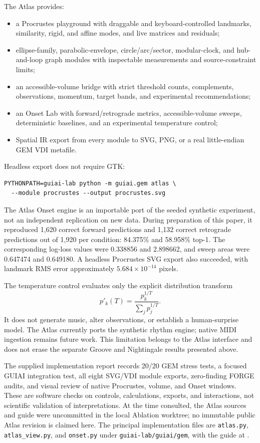 \documentclass[11pt,a4paper]{article}
\begin{document}
The Atlas provides:
\begin{itemize}[nosep]
  \item a Procrustes playground with draggable and keyboard-controlled landmarks, similarity, rigid, and affine modes, and live matrices and residuals;
  \item ellipse-family, parabolic-envelope, circle/arc/sector, modular-clock, and hub-and-loop graph modules with inspectable measurements and source-constraint limits;
  \item an accessible-volume bridge with strict threshold counts, complements, observations, momentum, target bands, and experimental recommendations;
  \item an Onset Lab with forward/retrograde metrics, accessible-volume sweeps, deterministic baselines, and an experimental temperature control;
  \item Spatial IR export from every module to SVG, PNG, or a real little-endian GEM VDI metafile.
\end{itemize}
Headless export does not require GTK:
\begin{lstlisting}
PYTHONPATH=guiai-lab python -m guiai.gem atlas \
  --module procrustes --output procrustes.svg
\end{lstlisting}

The Atlas Onset engine is an importable port of the seeded synthetic experiment, not an independent replication on new data. During preparation of this paper, it reproduced 1,620 correct forward predictions and 1,132 correct retrograde predictions out of 1,920 per condition: 84.375\% and 58.958\% top-1. The corresponding log-loss values were 0.338856 and 2.898662, and sweep areas were 0.647474 and 0.649180. A headless Procrustes SVG export also succeeded, with landmark RMS error approximately $5.684\times10^{-14}$ pixels.

The temperature control evaluates only the explicit distribution transform
\begin{equation}
p'_k(T)=\frac{p_k^{1/T}}{\sum_j p_j^{1/T}}.
\label{eq:atlas-temperature}
\end{equation}
It does not generate music, alter observations, or establish a human-surprise model. The Atlas currently ports the synthetic rhythm engine; native MIDI ingestion remains future work. This limitation belongs to the Atlas interface and does not erase the separate Groove and Nightingale results presented above.

The supplied implementation report records 20/20 GEM stress tests, a focused GUIAI integration test, all eight SVG/VDI module exports, zero-finding FORGE audits, and visual review of native Procrustes, volume, and Onset windows. These are software checks on controls, calculations, exports, and interactions, not scientific validation of interpretations. At the time consulted, the Atlas sources and guide were uncommitted in the local Ablation worktree; no immutable public Atlas revision is claimed here. The principal implementation files are \texttt{atlas.py}, \texttt{atlas\_view.py}, and \texttt{onset.py} under \texttt{guiai-lab/guiai/gem}, with the guide at .
\end{document}
